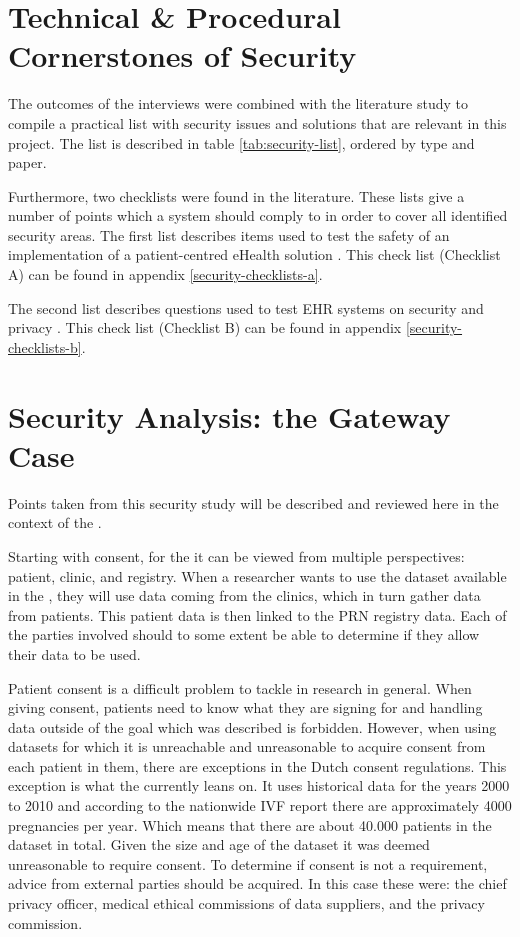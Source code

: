 \section{Technical \& Procedural Cornerstones of Security}
\label{security-summarisation}

The outcomes of the interviews were combined with the literature study to compile a practical list with security issues and solutions that are relevant in this project.
The list is described in table \ref{tab:security-list}, ordered by type and paper.

Furthermore, two checklists were found in the literature.
These lists give a number of points which a system should comply to in order to cover all identified security areas.
The first list describes items used to test the safety of an implementation of a patient-centred eHealth solution \cite{s17Dehling2014}.
This check list (Checklist A) can be found in appendix \ref{security-checklists-a}.

The second list describes questions used to test EHR systems on security and privacy \cite{s8FernandezAleman2013}.
This check list (Checklist B) can be found in appendix \ref{security-checklists-b}.



\section{Security Analysis: the \project{} Gateway Case}

Points taken from this security study will be described and reviewed here in the context of the \ivfsystem{}.

Starting with consent, for the \project{} it can be viewed from multiple perspectives: patient, clinic, and registry.
When a researcher wants to use the dataset available in the \ivfsystem{}, they will use data coming from the clinics, which in turn gather data from patients.
This patient data is then linked to the PRN registry data.
Each of the parties involved should to some extent be able to determine if they allow their data to be used.

Patient consent is a difficult problem to tackle in research in general.
When giving consent, patients need to know what they are signing for and handling data outside of the goal which was described is forbidden.
However, when using datasets for which it is unreachable and unreasonable to acquire consent from each patient in them, there are exceptions in the Dutch consent regulations.
This exception is what the \ivfsystem{} currently leans on. 
It uses historical data for the years 2000 to 2010 and according to the nationwide IVF report \cite{ivfReportNVOG} there are approximately 4000 pregnancies per year.
Which means that there are about 40.000 patients in the dataset in total.
Given the size and age of the dataset it was deemed unreasonable to require consent.
To determine if consent is not a requirement, advice from external parties should be acquired.
In this case these were: the \AMC{} chief privacy officer, medical ethical commissions of data suppliers, and the \PRN{} privacy commission.

